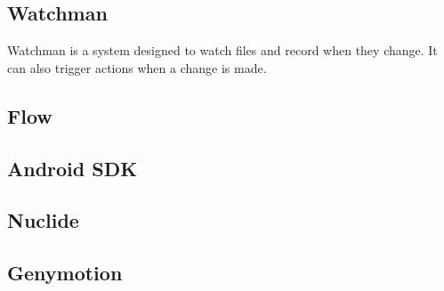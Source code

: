 \subsection{Watchman}

Watchman is a system designed to watch files and record when they change. It can also trigger actions when a change is made.

\subsection{Flow}

\subsection{Android SDK}

\subsection{Nuclide}

\subsection{Genymotion}